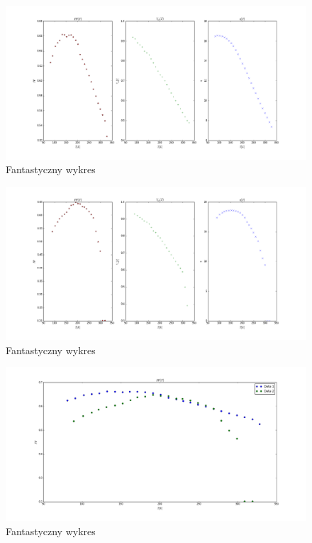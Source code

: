 \documentclass[a4paper,12pt]{article}
\begin{document}
\begin{figure} [H]
  \begin{center}
    \includegraphics[width = 15cm]{probka1_rozne.png}
    \caption{Fantastyczny wykres}
  \end{center}
\end{figure}

\begin{figure} [H]
  \begin{center}
    \includegraphics[width = 15cm]{probka2_rozne.png}
    \caption{Fantastyczny wykres}
  \end{center}
\end{figure}


\begin{figure} [H]
  \begin{center}
    \includegraphics[width = 15cm]{probki_porownanie_FF.png}
    \caption{Fantastyczny wykres}
  \end{center}
\end{figure}
\end{document}
